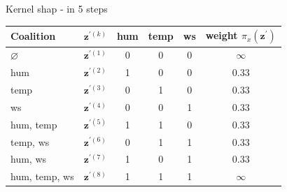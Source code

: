 \documentclass[10pt,compress,t,notes=noshow, xcolor=table]{beamer}
\begin{document}
\begin{framev}[align=top]{Kernel shap - in 5 steps}
\begin{table}
\centering
\begin{tabular}{l |c|ccc|c}
Coalition & $\mathbf{z}^{\prime (k)}$ &  hum & temp & ws & weight $\pi_{x}\left(\mathbf{z}^{\prime}\right)$\\
\hline 
$\varnothing$ & $\mathbf{z}^{\prime (1)}$ & 0 & 0 & 0 & $\infty$ \\
hum & $\mathbf{z}^{\prime (2)}$ & 1 & 0 & 0 & 0.33 \\
temp &  $\mathbf{z}^{\prime (3)}$ & 0 & 1 & 0 & 0.33 \\
ws &   $\mathbf{z}^{\prime (4)}$ & 0 & 0 & 1 & 0.33  \\
hum, temp & $\mathbf{z}^{\prime (5)}$ & 1 & 1 & 0 & 0.33 \\
temp, ws & $\mathbf{z}^{\prime (6)}$ & 0 & 1 & 1 & 0.33 \\
hum, ws &   $\mathbf{z}^{\prime (7)}$ & 1 & 0 & 1 & 0.33 \\
hum, temp, ws & $\mathbf{z}^{\prime (8)}$ & 1 & 1 & 1 & $\infty$ \\
\end{tabular}
\end{table}
\end{framev}





\end{document}
